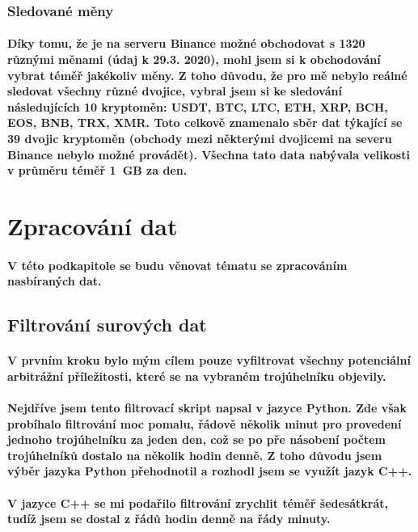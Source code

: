 \documentclass[thesis=B,czech]{FITthesis}[2019/03/21]
\begin{document}
\subsubsection{Sledované měny}
\paragraph{
Díky tomu, že je na serveru Binance možné obchodovat s 1320 různými měnami (údaj k 29.3. 2020), mohl jsem si k obchodování vybrat téměř jakékoliv měny. Z toho důvodu, že pro mě nebylo reálné sledovat všechny různé dvojice, vybral jsem si ke sledování následujících 10 kryptoměn: USDT, BTC, LTC, ETH, XRP, BCH, EOS, BNB, TRX, XMR. Toto celkově znamenalo sběr dat týkající se 39 dvojic kryptoměn (obchody mezi některými dvojicemi na severu Binance nebylo možné provádět). Všechna tato data nabývala velikosti v průměru téměř 1~GB za den.
}
\section{Zpracování dat}
\paragraph{
V této podkapitole se budu věnovat tématu se zpracováním nasbíraných dat.
}
\subsection{Filtrování surových dat}
\paragraph{
V prvním kroku bylo mým cílem pouze vyfiltrovat všechny potenciální arbitrážní příležitosti, které se na vybraném trojúhelníku objevily.
}
\paragraph{
Nejdříve jsem tento filtrovací skript napsal v jazyce Python. Zde však probíhalo filtrování moc pomalu, řádově několik minut pro provedení jednoho trojúhelníku za jeden den, což se po pře násobení počtem trojúhelníků dostalo na několik hodin denně. Z toho důvodu jsem výběr jazyka Python přehodnotil a rozhodl jsem se využít jazyk C++. 
}
\paragraph{
V jazyce C++ se mi podařilo filtrování zrychlit téměř šedesátkrát, tudíž jsem se dostal z řádů hodin denně na řády minuty.
}
\end{document}
